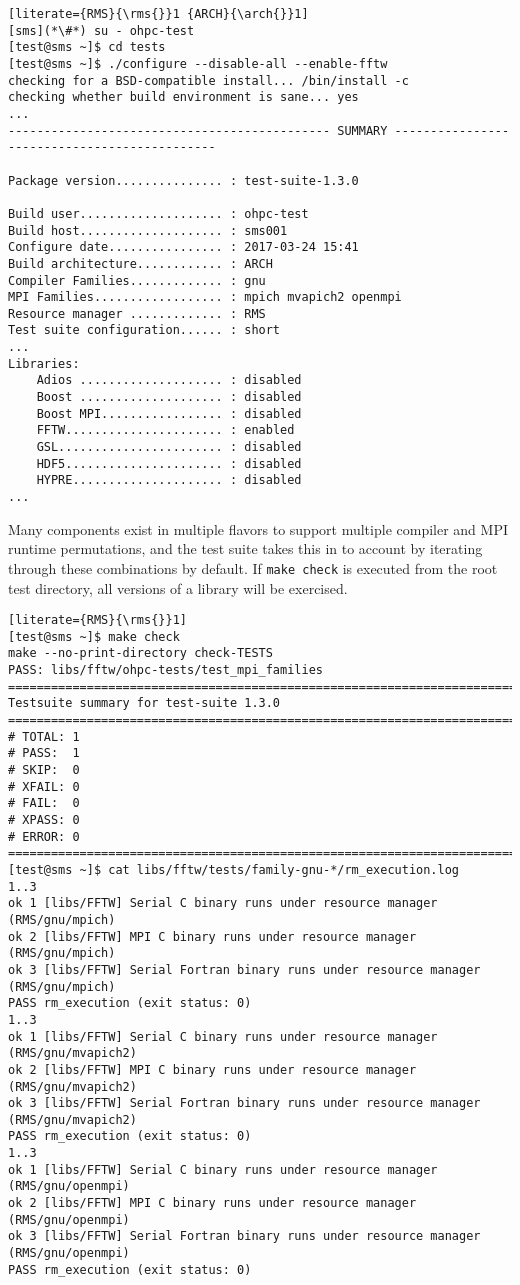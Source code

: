 \begin{lstlisting}[literate={RMS}{\rms{}}1 {ARCH}{\arch{}}1]
[sms](*\#*) su - ohpc-test
[test@sms ~]$ cd tests
[test@sms ~]$ ./configure --disable-all --enable-fftw
checking for a BSD-compatible install... /bin/install -c
checking whether build environment is sane... yes
...
--------------------------------------------- SUMMARY ---------------------------------------------

Package version............... : test-suite-1.3.0

Build user.................... : ohpc-test
Build host.................... : sms001
Configure date................ : 2017-03-24 15:41
Build architecture............ : ARCH
Compiler Families............. : gnu
MPI Families.................. : mpich mvapich2 openmpi
Resource manager ............. : RMS
Test suite configuration...... : short
...
Libraries:
    Adios .................... : disabled
    Boost .................... : disabled
    Boost MPI................. : disabled
    FFTW...................... : enabled
    GSL....................... : disabled
    HDF5...................... : disabled
    HYPRE..................... : disabled
...
\end{lstlisting}

Many \OHPC components exist in multiple flavors to support multiple compiler
and MPI runtime permutations, and the test suite takes this in to account by
iterating through these combinations by default. If \texttt{make check} is executed
from the root test directory, all versions of a library will be exercised.

\begin{lstlisting}[literate={RMS}{\rms{}}1]
[test@sms ~]$ make check
make --no-print-directory check-TESTS
PASS: libs/fftw/ohpc-tests/test_mpi_families
============================================================================
Testsuite summary for test-suite 1.3.0
============================================================================
# TOTAL: 1
# PASS:  1
# SKIP:  0
# XFAIL: 0
# FAIL:  0
# XPASS: 0
# ERROR: 0
============================================================================
[test@sms ~]$ cat libs/fftw/tests/family-gnu-*/rm_execution.log 
1..3
ok 1 [libs/FFTW] Serial C binary runs under resource manager (RMS/gnu/mpich)
ok 2 [libs/FFTW] MPI C binary runs under resource manager (RMS/gnu/mpich)
ok 3 [libs/FFTW] Serial Fortran binary runs under resource manager (RMS/gnu/mpich)
PASS rm_execution (exit status: 0)
1..3
ok 1 [libs/FFTW] Serial C binary runs under resource manager (RMS/gnu/mvapich2)
ok 2 [libs/FFTW] MPI C binary runs under resource manager (RMS/gnu/mvapich2)
ok 3 [libs/FFTW] Serial Fortran binary runs under resource manager (RMS/gnu/mvapich2)
PASS rm_execution (exit status: 0)
1..3
ok 1 [libs/FFTW] Serial C binary runs under resource manager (RMS/gnu/openmpi)
ok 2 [libs/FFTW] MPI C binary runs under resource manager (RMS/gnu/openmpi)
ok 3 [libs/FFTW] Serial Fortran binary runs under resource manager (RMS/gnu/openmpi)
PASS rm_execution (exit status: 0)
\end{lstlisting}
